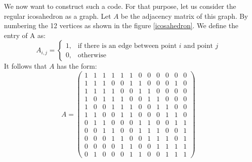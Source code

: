 \documentclass[12pt]{article}
\theoremstyle{definition}
\numberwithin{equation}{theorem}
\numberwithin{figure}{theorem}
\begin{document}
We now want to construct such a code. For that purpose, let us consider the regular icosahedron as a graph. Let $A$ be the adjacency matrix of this graph. By numbering the 12 vertices as shown in the figure \ref{icosahedron}. We define the entry of A as:
\[
	A_{i,j} = 
	\begin{cases}
		1, &\text{if there is an edge between point $i$ and point $j$}\\
		0, &\text{otherwise}
	\end{cases}
\]
It follows that $A$ has the form:
\[
	A =
	\begin{pmatrix}
		 1 & 1 & 1 & 1 & 1 & 1 & 0 & 0 & 0 & 0 & 0 & 0 \\ 
1 & 1 & 1 & 0 & 0 & 1 & 1 & 0 & 0 & 0 & 1 & 0 \\ 
1 & 1 & 1 & 1 & 0 & 0 & 1 & 1 & 0 & 0 & 0 & 0 \\ 
1 & 0 & 1 & 1 & 1 & 0 & 0 & 1 & 1 & 0 & 0 & 0 \\ 
1 & 0 & 0 & 1 & 1 & 1 & 0 & 0 & 1 & 1 & 0 & 0 \\ 
1 & 1 & 0 & 0 & 1 & 1 & 0 & 0 & 0 & 1 & 1 & 0 \\ 
0 & 1 & 1 & 0 & 0 & 0 & 1 & 1 & 0 & 0 & 1 & 1 \\ 
0 & 0 & 1 & 1 & 0 & 0 & 1 & 1 & 1 & 0 & 0 & 1 \\ 
0 & 0 & 0 & 1 & 1 & 0 & 0 & 1 & 1 & 1 & 0 & 1 \\ 
0 & 0 & 0 & 0 & 1 & 1 & 0 & 0 & 1 & 1 & 1 & 1 \\ 
0 & 1 & 0 & 0 & 0 & 1 & 1 & 0 & 0 & 1 & 1 & 1		
	\end{pmatrix}
\]
\end{document}
